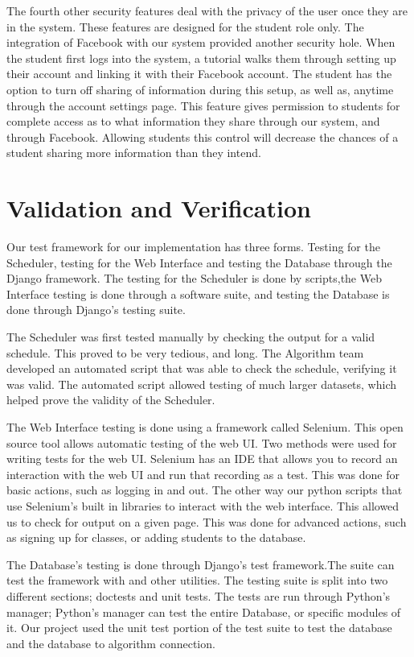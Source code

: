 \documentclass[12pt]{article}
\begin{document}
\begin{enumerate}
The fourth other security features deal with the privacy of the user once they are in the system. These features are designed for the student role only. The integration of Facebook with our system provided another security hole. When the student first logs into the system, a tutorial walks them through setting up their account and linking it with their Facebook account. The student has the option to turn off sharing of information during this setup, as well as, anytime through the account settings page. This feature gives permission to students for complete access as to what information they share through our system, and through Facebook. Allowing students this control will decrease the chances of a student sharing more information than they intend. %

\section{Validation and Verification} %
Our test framework for our implementation has three forms. Testing for the Scheduler, testing for the Web Interface and testing the Database through the Django framework. The testing for the Scheduler is done by scripts,the Web Interface testing is done through a software suite, and testing the Database is done through Django's testing suite.

The Scheduler was first tested manually by checking the output for a valid schedule. This proved to be very tedious, and long. The Algorithm team developed an automated script that was able to check the schedule, verifying it was valid. The automated script allowed testing of much larger datasets, which helped prove the validity of the Scheduler.

The Web Interface testing is done using a framework called Selenium. This open source tool allows automatic testing of the web UI. Two methods were used for writing tests for the web UI. Selenium has an IDE that allows you to record an interaction with the web UI and run that recording as a test. This was done for basic actions, such as logging in and out. The other way our python scripts that use Selenium's built in libraries to interact with the web interface. This allowed us to check for output on a given page. This was done for advanced actions, such as signing up for classes, or adding students to the database.

The Database's testing is done through  Django's test framework.The suite can test the framework with and other utilities. The testing suite is split into two different sections; doctests and unit tests. The tests are run through Python's manager; Python's manager can test the entire Database, or specific modules of it. Our project used the unit test portion of the test suite to test the database and the database to algorithm connection.


\end{enumerate}
\end{document}
